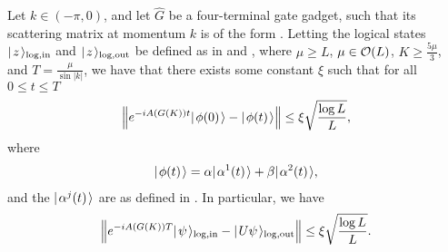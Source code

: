 \documentclass[../thesis-main/thesis-main]{subfiles}
\begin{document}
\begin{lemma}
\label{lem:single_qubit_encoded_computation}
  Let $k\in (-\pi,0)$, and let $\widehat{G}$ be a four-terminal gate gadget, such that its scattering matrix at momentum $k$ is of the form .  Letting the logical states $|\mspace{2mu} z \mspace{2mu} \rangle_{\text{log},\text{in}}$ and $|\mspace{2mu} z \mspace{2mu} \rangle_{\text{log},\text{out}}$ be defined as in  and , where $\mu \geq L $, $\mu \in \mathcal{O}(L)$, $K \geq \frac{5 \mu}{3}$, and $T = \frac{\mu}{\sin |k|}$, we have that there exists some constant $\xi$ such that for all $0 \leq t \leq T$
\begin{align}
  \Big\Vert e^{-i A(G(K))t} |\mspace{2mu} \phi(0) \mspace{2mu} \rangle - |\mspace{2mu} \phi(t) \mspace{2mu} \rangle \Big\Vert \leq \xi \sqrt{\frac{\log L}{L}},
\end{align}
where
\begin{align}
  |\mspace{2mu} \phi(t) \mspace{2mu} \rangle = \alpha |\mspace{2mu} \alpha^{1}(t) \mspace{2mu} \rangle + \beta |\mspace{2mu} \alpha^2(t) \mspace{2mu} \rangle,
\end{align}
and the $|\mspace{2mu} \alpha^j(t) \mspace{2mu} \rangle$ are as defined in .  In particular, we have
\begin{align}
  \Big\Vert e^{-i A(G(K)) T} |\mspace{2mu} \psi \mspace{2mu} \rangle_{\text{log},\text{in}} - |\mspace{2mu} U\psi \mspace{2mu} \rangle_{\text{log},\text{out}} \Big\Vert \leq \xi \sqrt{\frac{\log L}{L}}.
\end{align}
\end{lemma}
\end{document}
